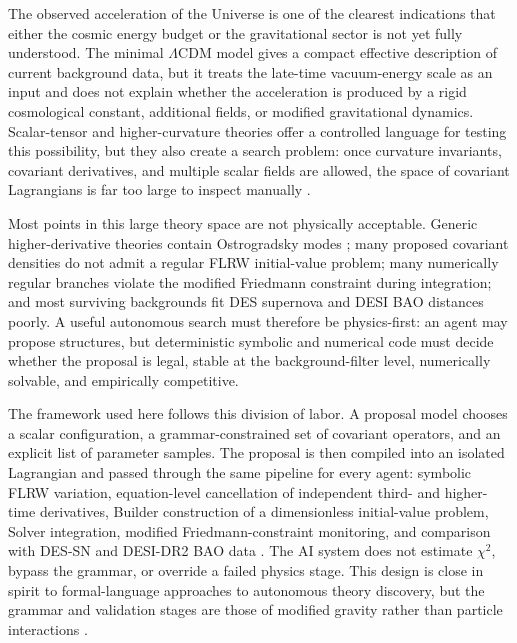 \documentclass[aps,prd,twocolumn,superscriptaddress,nofootinbib,longbibliography]{revtex4-2}
\begin{document}
The observed acceleration of the Universe is one of the clearest indications that either the cosmic energy budget or the gravitational sector is not yet fully understood.  The minimal $\Lambda$CDM model gives a compact effective description of current background data, but it treats the late-time vacuum-energy scale as an input and does not explain whether the acceleration is produced by a rigid cosmological constant, additional fields, or modified gravitational dynamics.  Scalar-tensor and higher-curvature theories offer a controlled language for testing this possibility, but they also create a search problem: once curvature invariants, covariant derivatives, and multiple scalar fields are allowed, the space of covariant Lagrangians is far too large to inspect manually \cite{Clifton2012,SotiriouFaraoni2010,Horndeski1974}.

Most points in this large theory space are not physically acceptable.  Generic higher-derivative theories contain Ostrogradsky modes \cite{Ostrogradsky1850}; many proposed covariant densities do not admit a regular FLRW initial-value problem; many numerically regular branches violate the modified Friedmann constraint during integration; and most surviving backgrounds fit DES supernova and DESI BAO distances poorly.  A useful autonomous search must therefore be physics-first: an agent may propose structures, but deterministic symbolic and numerical code must decide whether the proposal is legal, stable at the background-filter level, numerically solvable, and empirically competitive.

The framework used here follows this division of labor.  A proposal model chooses a scalar configuration, a grammar-constrained set of covariant operators, and an explicit list of parameter samples.  The proposal is then compiled into an isolated Lagrangian and passed through the same pipeline for every agent: symbolic FLRW variation, equation-level cancellation of independent third- and higher-time derivatives, Builder construction of a dimensionless initial-value problem, Solver integration, modified Friedmann-constraint monitoring, and comparison with DES-SN and DESI-DR2 BAO data \cite{DES2024SN,DESI2025BAO}.  The AI system does not estimate $\chi^2$, bypass the grammar, or override a failed physics stage.  This design is close in spirit to formal-language approaches to autonomous theory discovery, but the grammar and validation stages are those of modified gravity rather than particle interactions \cite{Alexander2026Albert}.
\end{document}
